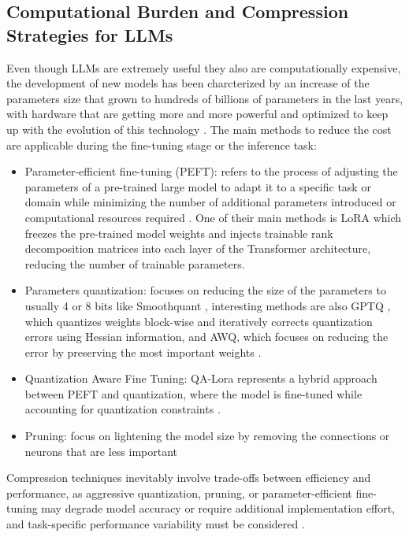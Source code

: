 \subsection{Computational Burden and Compression Strategies for LLMs}
Even though LLMs are extremely useful they also are computationally expensive, the development of new models has been charcterized by an increase of the parameters size that grown to hundreds of billions of parameters in the last years, with hardware that are getting more and more powerful and optimized to keep up with the evolution of this technology \cite{li2024large}. 
The main methods to reduce the cost are applicable during the fine-tuning stage or the inference task:
\begin{itemize}
    \item Parameter-efficient fine-tuning (PEFT): refers to the process of adjusting the parameters of a pre-trained large model to adapt it to a specific task or domain while minimizing the number of additional parameters introduced or computational resources required \cite{han2024parameter}. One of their main methods is LoRA \cite{hu2022lora} which freezes the pre-trained model weights and injects trainable rank decomposition matrices into each layer of the Transformer architecture, reducing the number of trainable parameters.
    \item Parameters quantization: focuses on reducing the size of the parameters to usually 4 or 8 bits like Smoothquant \cite{xiao2023smoothquant}, interesting methods are also GPTQ \cite{frantar2022gptq}, which quantizes weights block-wise and iteratively corrects quantization errors using Hessian information, and AWQ, which focuses on reducing the error by preserving the most important weights \cite{awq}.
    \item Quantization Aware Fine Tuning: QA-Lora represents a hybrid approach between PEFT and quantization, where the model is fine-tuned while accounting for quantization constraints \cite{xu2023qa}.
    \item Pruning: focus on lightening the model size by removing the connections or neurons that are less important \cite{gordon2020compressing, sreenivas2024llm}
\end{itemize}

Compression techniques inevitably involve trade-offs between efficiency and performance, as aggressive quantization, pruning, or parameter-efficient fine-tuning may degrade model accuracy or require additional implementation effort, and task-specific performance variability must be considered \cite{frantar2022gptq, awq, hu2022lora, gordon2020compressing}.

